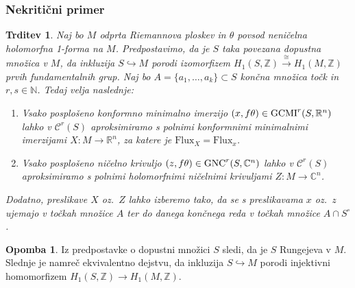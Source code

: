 \documentclass[12pt,a4paper,twoside]{article}
\theoremstyle{definition} %
\newtheorem{opomba}[definicija]{Opomba}
\theoremstyle{plain} %
\newtheorem{trditev}[definicija]{Trditev}
\numberwithin{equation}{section}  %
\newcommand{\R}{\mathbb R}
\newcommand{\N}{\mathbb N}
\newcommand{\Z}{\mathbb Z}
\newcommand{\C}{\mathbb C}
\begin{document}
\subsubsection{Nekritični primer}
%
\begin{trditev} \label{trd:nekritcni-primer}
Naj bo $M$ odprta Riemannova ploskev in $\theta$ povsod neničelna holomorfna 1-forma na $M$.
Predpostavimo, da je $S$ taka povezana dopustna množica v $M$, da inkluzija $S \hookrightarrow M$ porodi izomorfizem $H_{1}(S,\Z) \stackrel{\cong}{\longrightarrow} H_{1}(M,\Z)$ prvih fundamentalnih grup. Naj bo $A=\{a_{1}, \dots , a_{k} \} \subset S$ končna množica točk in $r, s \in \N$. Tedaj velja naslednje:
\begin{enumerate}
\item 
Vsako posplošeno konformno minimalno imerzijo $(x, f\theta) \in \textup{GCMI}^{r}(S,\R^{n})$ lahko v $\mathcal{C}^{r}(S)$ aproksimiramo s polnimi konformnimi minimalnimi imerzijami $X \colon M \to \R^{n}$, za katere je $\mathrm{Flux}_{X} = \mathrm{Flux}_{x}$. 
\item
Vsako posplošeno ničelno krivuljo $(z, f\theta) \in \textup{GNC}^{r}(S,\C^{n})$ lahko v $\mathcal{C}^{r}(S)$ aproksimiramo s polnimi holomorfnimi ničelnimi krivuljami $Z \colon M \to \C^{n}$.
\end{enumerate}
Dodatno, preslikave $X$ oz.~$Z$ lahko izberemo tako, da se s preslikavama $x$ oz.~$z$ ujemajo v točkah množice $A$ ter do danega končnega reda v točkah množice $A \cap S^{\circ}$.
\end{trditev}

\begin{opomba}
Iz predpostavke o dopustni množici $S$ sledi, da je $S$ Rungejeva v $M$. Slednje je namreč ekvivalentno dejstvu, da inkluzija $S \hookrightarrow M$ porodi injektivni homomorfizem $H_{1}(S,\Z) \to H_{1}(M,\Z)$.
\end{opomba}
\end{document}
